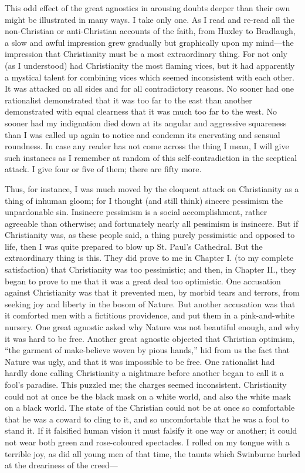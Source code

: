 This odd effect of the great agnostics in arousing doubts deeper than their own might be illustrated in many ways. I take only one. As I read and re-read all the non-Christian or anti-Christian accounts of the faith, from Huxley to Bradlaugh, a slow and awful impression grew gradually but graphically upon my mind—the impression that Christianity must be a most extraordinary thing. For not only (as I understood) had Christianity the most flaming vices, but it had apparently a mystical talent for combining vices which seemed inconsistent with each other. It was attacked on all sides and for all contradictory reasons. No sooner had one rationalist demonstrated that it was too far to the east than another demonstrated with equal clearness that it was much too far to the west. No sooner had my indignation died down at its angular and aggressive squareness than I was called up again to notice and condemn its enervating and sensual roundness. In case any reader has not come across the thing I mean, I will give such instances as I remember at random of this self-contradiction in the sceptical attack. I give four or five of them; there are fifty more.

Thus, for instance, I was much moved by the eloquent attack on Christianity as a thing of inhuman gloom; for I thought (and still think) sincere pessimism the unpardonable sin. Insincere pessimism is a social accomplishment, rather agreeable than otherwise; and fortunately nearly all pessimism is insincere. But if Christianity was, as these people said, a thing purely pessimistic and opposed to life, then I was quite prepared to blow up St. Paul’s Cathedral. But the extraordinary thing is this. They did prove to me in Chapter I. (to my complete satisfaction) that Christianity was too pessimistic; and then, in Chapter II., they began to prove to me that it was a great deal too optimistic. One accusation against Christianity was that it prevented men, by morbid tears and terrors, from seeking joy and liberty in the bosom of Nature. But another accusation was that it comforted men with a fictitious providence, and put them in a pink-and-white nursery. One great agnostic asked why Nature was not beautiful enough, and why it was hard to be free. Another great agnostic objected that Christian optimism, “the garment of make-believe woven by pious hands,” hid from us the fact that Nature was ugly, and that it was impossible to be free. One rationalist had hardly done calling Christianity a nightmare before another began to call it a fool’s paradise. This puzzled me; the charges seemed inconsistent. Christianity could not at once be the black mask on a white world, and also the white mask on a black world. The state of the Christian could not be at once so comfortable that he was a coward to cling to it, and so uncomfortable that he was a fool to stand it. If it falsified human vision it must falsify it one way or another; it could not wear both green and rose-coloured spectacles. I rolled on my tongue with a terrible joy, as did all young men of that time, the taunts which Swinburne hurled at the dreariness of the creed—

